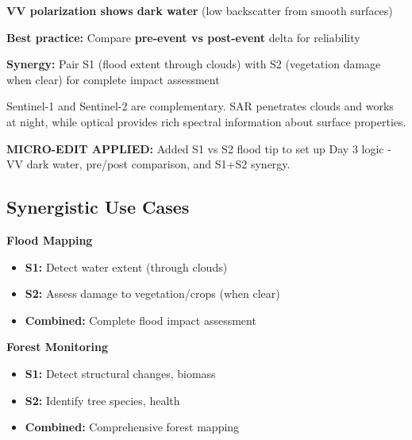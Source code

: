 \documentclass[
  letterpaper,
  DIV=11,
  numbers=noendperiod]{scrartcl}
\providecommand{\tightlist}{%
  \setlength{\itemsep}{0pt}\setlength{\parskip}{0pt}}
\begin{document}
\begin{tcolorbox}[enhanced jigsaw, left=2mm, opacityback=0, toprule=.15mm, breakable, title=\textcolor{quarto-callout-tip-color}{\faLightbulb}\hspace{0.5em}{S1 Flood Mapping Tip}, colbacktitle=quarto-callout-tip-color!10!white, arc=.35mm, titlerule=0mm, colback=white, bottomtitle=1mm, colframe=quarto-callout-tip-color-frame, leftrule=.75mm, toptitle=1mm, rightrule=.15mm, bottomrule=.15mm, opacitybacktitle=0.6, coltitle=black]

\textbf{VV polarization shows dark water} (low backscatter from smooth
surfaces)

\textbf{Best practice:} Compare \textbf{pre-event vs post-event} delta
for reliability

\textbf{Synergy:} Pair S1 (flood extent through clouds) with S2
(vegetation damage when clear) for complete impact assessment

\end{tcolorbox}

Sentinel-1 and Sentinel-2 are complementary. SAR penetrates clouds and
works at night, while optical provides rich spectral information about
surface properties.

\textbf{MICRO-EDIT APPLIED:} Added S1 vs S2 flood tip to set up Day 3
logic - VV dark water, pre/post comparison, and S1+S2 synergy.

\subsection{Synergistic Use Cases}\label{synergistic-use-cases}

\textbf{Flood Mapping}

\begin{itemize}
\tightlist
\item
  \textbf{S1:} Detect water extent (through clouds)
\item
  \textbf{S2:} Assess damage to vegetation/crops (when clear)
\item
  \textbf{Combined:} Complete flood impact assessment
\end{itemize}

\textbf{Forest Monitoring}

\begin{itemize}
\tightlist
\item
  \textbf{S1:} Detect structural changes, biomass
\item
  \textbf{S2:} Identify tree species, health
\item
  \textbf{Combined:} Comprehensive forest mapping
\end{itemize}
\end{document}
